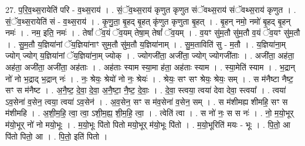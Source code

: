 \documentclass[17pt]{extarticle}
\begin{document}
27. प॒रि॒व॒थ्स॒रायेति॑ परि - व॒थ्स॒राय॑ । . सं॒ॅव॒थ्स॒राय॑ कृणुत कृणुत संॅवथ्स॒राय॑ संॅवथ्स॒राय॑ कृणुत । . सं॒ॅव॒थ्स॒रायेति॑ सं - व॒थ्स॒राय॑ । . कृ॒णु॒ता॒ बृ॒हद् बृ॒हत् कृ॑णुत कृणुता बृ॒हत् । . बृ॒हन् नमो॒ नमो॑ बृ॒हद् बृ॒हन् नमः॑ । . नम॒ इति॒ नमः॑ । . तेषां᳚ ॅव॒यं ॅव॒यम् तेषा॒म् तेषां᳚ ॅव॒यम् । . व॒यꣳ सु॑म॒तौ सु॑म॒तौ व॒यं ॅव॒यꣳ सु॑म॒तौ । . सु॒म॒तौ य॒ज्ञिया॑नां ॅय॒ज्ञिया॑नाꣳ सुम॒तौ सु॑म॒तौ य॒ज्ञिया॑नाम् । . सु॒म॒ताविति॑ सु - म॒तौ । . य॒ज्ञिया॑ना॒म् ज्योग् ज्योग् य॒ज्ञिया॑नां ॅय॒ज्ञिया॑ना॒म् ज्योक् । . ज्योगजी॑ता॒ अजी॑ता॒ ज्योग् ज्योगजी॑ताः । . अजी॑ता॒ अह॑ता॒ अह॑ता॒ अजी॑ता॒ अजी॑ता॒ अह॑ताः । . अह॑ताः स्याम स्या॒मा ह॑ता॒ अह॑ताः स्याम । . स्या॒मेति॑ स्याम । . भ॒द्रान् नो॑ नो भ॒द्राद् भ॒द्रान् नः॑ । . नः॒ श्रेयः॒ श्रेयो॑ नो नः॒ श्रेयः॑ । . श्रेयः॒ सꣳ सꣳ श्रेयः॒ श्रेयः॒ सम् । . स म॑नैष्टा नैष्ट॒ सꣳ स म॑नैष्ट । . अ॒नै॒ष्ट॒ दे॒वा॒ दे॒वा॒ अ॒नै॒ष्टा॒ नै॒ष्ट॒ दे॒वाः॒ । . दे॒वा॒ स्त्वया॒ त्वया॑ देवा देवा॒ स्त्वया᳚ । . त्वया॑ ऽव॒सेना॑ व॒सेन॒ त्वया॒ त्वया॑ ऽव॒सेन॑ । . अ॒व॒सेन॒ सꣳ स म॑व॒सेना॑ व॒सेन॒ सम् । . स म॑शीमह्य शीमहि॒ सꣳ स म॑शीमहि । . अ॒शी॒म॒हि॒ त्वा॒ त्वा॒ ऽशी॒म॒ह्य॒ शी॒म॒हि॒ त्वा॒ । . त्वेति॑ त्वा । . स नो॑ नः॒ स स नः॑ । . नो॒ म॒यो॒भूर् म॑यो॒भूर् नो॑ नो मयो॒भूः । . म॒यो॒भूः पि॑तो पितो मयो॒भूर् म॑यो॒भूः पि॑तो । . म॒यो॒भूरिति॑ मयः - भूः । . पि॒तो॒ आ पि॑तो पितो॒ आ । . पि॒तो॒ इति॑ पितो । \newline
\end{document}

